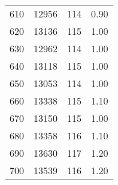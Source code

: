 \begin{table}[H]
\begin{tabular}{S S S S}
    610 & 12956 & 114 & 0.90 \\
    620 & 13136 & 115 & 1.00 \\
    630 & 12962 & 114 & 1.00 \\
    640 & 13118 & 115 & 1.00 \\
    650 & 13053 & 114 & 1.00 \\
    660 & 13338 & 115 & 1.10 \\
    670 & 13150 & 115 & 1.00 \\
    680 & 13358 & 116 & 1.10 \\
    690 & 13630 & 117 & 1.20 \\
    700 & 13539 & 116 & 1.20 \\



          \bottomrule
    \end{tabular}
  \end{table}
